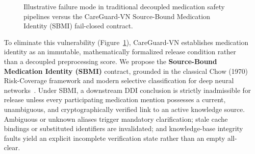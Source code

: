 \documentclass[11pt]{article}
\begin{document}
\begin{figure}[t]
\centering
{}
\caption{Illustrative failure mode in traditional decoupled medication safety pipelines versus the CareGuard-VN Source-Bound Medication Identity (SBMI) fail-closed contract.}
\label{fig:motivating_example}
\end{figure}

To eliminate this vulnerability (Figure~\ref{fig:motivating_example}), CareGuard-VN establishes medication identity as an immutable, mathematically formalized release condition rather than a decoupled preprocessing score. We propose the \textbf{Source-Bound Medication Identity (SBMI)} contract, grounded in the classical Chow (1970) Risk-Coverage framework and modern selective classification for deep neural networks~\cite{chow1970,geifman2017selective}. Under SBMI, a downstream DDI conclusion is strictly inadmissible for release unless every participating medication mention possesses a current, unambiguous, and cryptographically verified link to an active knowledge source. Ambiguous or unknown aliases trigger mandatory clarification; stale cache bindings or substituted identifiers are invalidated; and knowledge-base integrity faults yield an explicit incomplete verification state rather than an empty all-clear.
\end{document}
